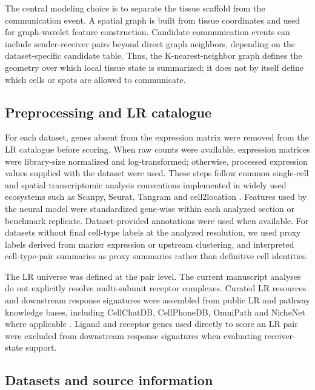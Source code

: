 \documentclass[referee,lineno,pdflatex,sn-vancouver-num]{sn-jnl}
\begin{document}
The central modeling choice is to separate the tissue scaffold from the communication event. A spatial graph is built from tissue coordinates and used for graph-wavelet feature construction. Candidate communication events can include sender-receiver pairs beyond direct graph neighbors, depending on the dataset-specific candidate table. Thus, the K-nearest-neighbor graph defines the geometry over which local tissue state is summarized; it does not by itself define which cells or spots are allowed to communicate.

\subsection{Preprocessing and LR catalogue}

For each dataset, genes absent from the expression matrix were removed from the LR catalogue before scoring. When raw counts were available, expression matrices were library-size normalized and log-transformed; otherwise, processed expression values supplied with the dataset were used. These steps follow common single-cell and spatial transcriptomic analysis conventions implemented in widely used ecosystems such as Scanpy, Seurat, Tangram and cell2location \citep{scanpy2018,seurat2019,tangram2021,cell2location2022}. Features used by the neural model were standardized gene-wise within each analyzed section or benchmark replicate. Dataset-provided annotations were used when available. For datasets without final cell-type labels at the analyzed resolution, we used proxy labels derived from marker expression or upstream clustering, and interpreted cell-type-pair summaries as proxy summaries rather than definitive cell identities.

The LR universe was defined at the pair level. The current manuscript analyses do not explicitly resolve multi-subunit receptor complexes. Curated LR resources and downstream response signatures were assembled from public LR and pathway knowledge bases, including CellChatDB, CellPhoneDB, OmniPath and NicheNet where applicable \citep{cellchat2021,cellphonedb2020,omnipath2021,nichenet2020}. Ligand and receptor genes used directly to score an LR pair were excluded from downstream response signatures when evaluating receiver-state support.

\subsection{Datasets and source information}
\end{document}
